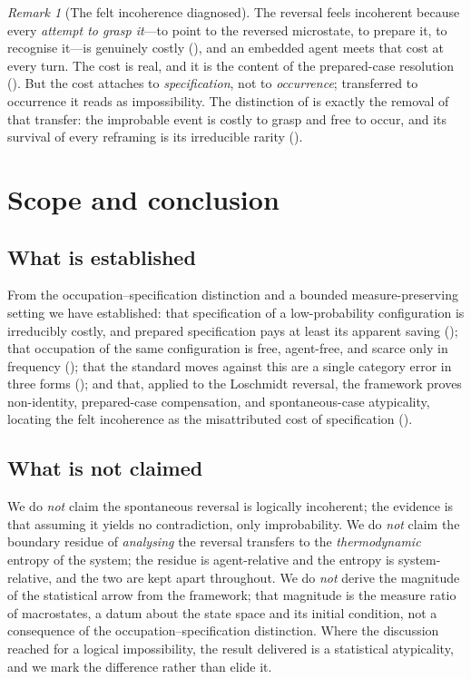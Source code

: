 \documentclass[11pt,a4paper]{article}
\theoremstyle{thmstyle}
\theoremstyle{definition}
\theoremstyle{remark}
\newtheorem{remark}[theorem]{Remark}
\begin{document}
\begin{remark}[The felt incoherence diagnosed]
\label{rem:diagnosis}
The reversal feels incoherent because every \emph{attempt to grasp it}---to point
to the reversed microstate, to prepare it, to recognise it---is genuinely costly
(), and an embedded agent meets that cost at every turn. The cost
is real, and it is the content of the prepared-case resolution
(). But the cost attaches to \emph{specification}, not to
\emph{occurrence}; transferred to occurrence it reads as impossibility. The
distinction of  is exactly the removal of that transfer: the
improbable event is costly to grasp and free to occur, and its survival of every
reframing is its irreducible rarity ().
\end{remark}

\section{Scope and conclusion}
\label{sec:scope}

\subsection{What is established}

From the occupation--specification distinction and a bounded measure-preserving
setting we have established: that specification of a low-probability
configuration is irreducibly costly, and prepared specification pays at least its
apparent saving (); that occupation of the same configuration is
free, agent-free, and scarce only in frequency (); that the
standard moves against this are a single category error in three forms
(); and that, applied to the Loschmidt reversal, the framework
proves non-identity, prepared-case compensation, and spontaneous-case
atypicality, locating the felt incoherence as the misattributed cost of
specification ().

\subsection{What is not claimed}

We do \emph{not} claim the spontaneous reversal is logically incoherent; the
evidence is that assuming it yields no contradiction, only improbability. We do
\emph{not} claim the boundary residue of \emph{analysing} the reversal transfers
to the \emph{thermodynamic} entropy of the system; the residue is agent-relative
and the entropy is system-relative, and the two are kept apart throughout. We do
\emph{not} derive the magnitude of the statistical arrow from the framework; that
magnitude is the measure ratio of macrostates, a datum about the state space and
its initial condition, not a consequence of the occupation--specification
distinction. Where the discussion reached for a logical impossibility, the result
delivered is a statistical atypicality, and we mark the difference rather than
elide it.
\end{document}
